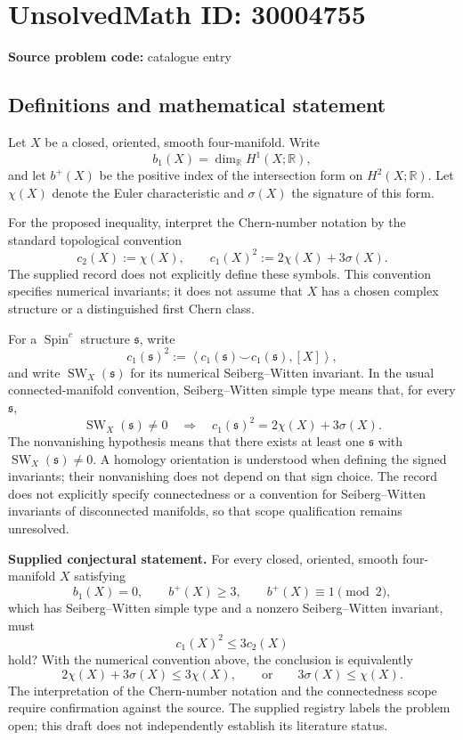 \documentclass[11pt]{article}
\newcommand{\R}{\mathbb{R}}
\begin{document}
\section*{UnsolvedMath ID: 30004755}
\textbf{Source problem code:} catalogue entry
\subsection{Definitions and mathematical statement}
Let \(X\) be a closed, oriented, smooth four-manifold. Write
\[
b_1(X)=\dim_{\R}H^1(X;\R),
\]
and let \(b^+(X)\) be the positive index of the intersection form on \(H^2(X;\R)\). Let \(\chi(X)\) denote the Euler characteristic and \(\sigma(X)\) the signature of this form.

For the proposed inequality, interpret the Chern-number notation by the standard topological convention
\[
c_2(X):=\chi(X),\qquad c_1(X)^2:=2\chi(X)+3\sigma(X).
\]
The supplied record does not explicitly define these symbols. This convention specifies numerical invariants; it does not assume that \(X\) has a chosen complex structure or a distinguished first Chern class.

For a \(\operatorname{Spin}^c\) structure \(\mathfrak{s}\), write
\[
c_1(\mathfrak{s})^2
:=\left\langle c_1(\mathfrak{s})\smile c_1(\mathfrak{s}),[X]\right\rangle,
\]
and write \(\operatorname{SW}_X(\mathfrak{s})\) for its numerical Seiberg--Witten invariant. In the usual connected-manifold convention, Seiberg--Witten simple type means that, for every \(\mathfrak{s}\),
\[
\operatorname{SW}_X(\mathfrak{s})\ne0
\quad\Longrightarrow\quad
c_1(\mathfrak{s})^2=2\chi(X)+3\sigma(X).
\]
The nonvanishing hypothesis means that there exists at least one \(\mathfrak{s}\) with \(\operatorname{SW}_X(\mathfrak{s})\ne0\). A homology orientation is understood when defining the signed invariants; their nonvanishing does not depend on that sign choice. The record does not explicitly specify connectedness or a convention for Seiberg--Witten invariants of disconnected manifolds, so that scope qualification remains unresolved.

\textbf{Supplied conjectural statement.} For every closed, oriented, smooth four-manifold \(X\) satisfying
\[
b_1(X)=0,\qquad b^+(X)\ge3,\qquad b^+(X)\equiv1\pmod2,
\]
which has Seiberg--Witten simple type and a nonzero Seiberg--Witten invariant, must
\[
c_1(X)^2\le3c_2(X)
\]
hold? With the numerical convention above, the conclusion is equivalently
\[
2\chi(X)+3\sigma(X)\le3\chi(X),
\qquad\text{or}\qquad
3\sigma(X)\le\chi(X).
\]
The interpretation of the Chern-number notation and the connectedness scope require confirmation against the source. The supplied registry labels the problem open; this draft does not independently establish its literature status.
\end{document}
